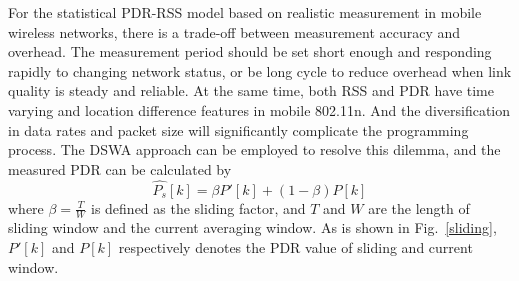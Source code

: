 \documentclass[draftclsnofoot,journal,onecolumn,11pt]{IEEEtran}
\begin{document}
For the statistical PDR-RSS model based on realistic measurement in mobile wireless networks, there is a trade-off between measurement accuracy and overhead. The measurement period should be set short enough and responding rapidly to changing network status, or be long cycle to reduce overhead when link quality is steady and reliable. At the same time, both RSS and PDR have time varying and location difference features in mobile 802.11n. And the diversification in data rates and packet size will significantly complicate the programming process. The DSWA approach can be employed to resolve this dilemma, and the measured PDR can be calculated by
\begin{equation}
 \hat{P_s}[k]=\beta P'[k]+(1-\beta)P[k]
 \label{P_s}
\end{equation}
where $\beta=\frac{T}{W}$ is defined as the sliding factor, and $T$ and $W$ are the length of sliding window and the current averaging window. As is shown in Fig.~\ref{sliding}, $P'[k]$ and $P[k]$ respectively denotes the PDR value of sliding and current window.
\end{document}
